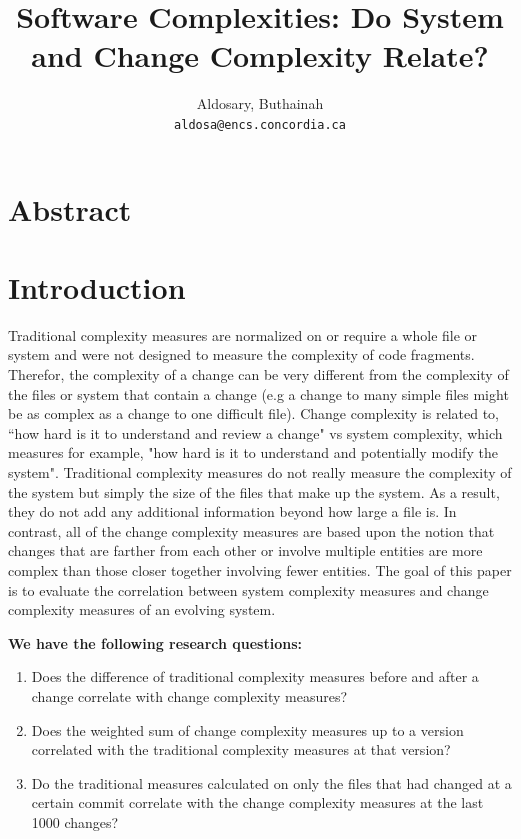 \documentclass[9pt,twocolumn,a4paper]{article}
\begin{document}
\author{Aldosary, Buthainah\\
\texttt{aldosa@encs.concordia.ca}}

\date{}
\title{Software Complexities: Do System and Change Complexity Relate?}




\maketitle
\section{Abstract}
\section{Introduction}

Traditional complexity measures are normalized on or require a whole file or system and were not designed to measure the complexity of code fragments. Therefor, the complexity of a change can be very different from the complexity of the files or system that contain a change (e.g a change to many simple files might be as complex as a change to one difficult file). Change complexity is related to, ``how hard is it to understand and review a change" vs system complexity, which measures for example, "how hard is it to understand and potentially modify the system". Traditional complexity measures do not really measure the complexity of the system but simply the size of the files that make up the system. As a result, they do not add any additional information beyond how large a file is. In contrast, all of the change complexity measures are based upon the notion that changes that are farther from each other or involve multiple entities are more complex than those closer together involving fewer entities. The goal of this paper is to evaluate the correlation between system complexity measures and change complexity measures of an evolving system. 
\newline

\textbf{We have the following research questions:}

\begin{enumerate}

\item Does the difference of traditional complexity measures before and after a change correlate with change complexity measures?

\item Does the weighted sum of change complexity measures up to a version correlated with the traditional complexity measures at that version? 

\item Do the traditional measures calculated on only the files that had changed at a certain commit correlate with the change complexity measures at the last 1000 changes?

\end{enumerate}
\end{document}
